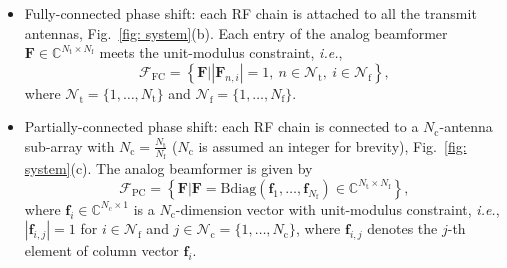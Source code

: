 \documentclass[10pt,journal,twocolumn]{IEEEtran}
\begin{document}
\begin{itemize}
\item Fully-connected phase shift: each RF chain is attached to all the transmit antennas,  Fig.~\ref{fig: system}(b). Each entry of the analog beamformer $\mathbf{F}\in\mathbb{C}^{N_{\text{t}}\times N_{\text{f}}}$ meets the unit-modulus constraint, \emph{i.e.}, 
\begin{equation}
\mathcal{F}_{\text{FC}}=\left\{\mathbf{F}\big|\left|\mathbf{F}_{n,i}\right|=1,~n\in\mathcal{N}_{\text{t}},~i\in\mathcal{N}_{\text{f}}\right\},
\end{equation}
where $\mathcal{N}_{\text{t}}=\{1,\dots,N_{\text{t}}\}$ and $\mathcal{N}_{\text{f}}=\{1,\dots,N_\text{f}\}$. 

\item Partially-connected phase shift: each RF chain is connected to a $N_{\text{c}}$-antenna sub-array with $N_{\text{c}}=\frac{N_{\text{t}}}{N_{\text{f}}}$ ($N_{\text{c}}$ is assumed an integer for brevity),  Fig.~\ref{fig: system}(c). The analog beamformer is given by
\begin{equation}
\mathcal{F}_{\text{PC}}=\left\{\mathbf{F}\big|\mathbf{F}=\text{Bdiag}\left(\mathbf{f}_1,\dots,\mathbf{f}_{N_{\text{f}}}\right)\in\mathbb{C}^{N_{\text{t}}\times N_{\text{f}}}\right\},
\end{equation}
where  $\mathbf{f}_{i}\in\mathbb{C}^{N_{\text{c}}\times 1}$ is a $N_{\text{c}}$-dimension vector with unit-modulus constraint, \emph{i.e.}, $\left|\mathbf{f}_{i,j}\right|=1$ for $i\in\mathcal{N}_{\text{f}}$ and $j\in\mathcal{N}_\text{c}=\{1,\dots,N_{\text{c}}\}$, where $\mathbf{f}_{i,j}$ denotes the $j$-th element of column vector $\mathbf{f}_i$.
\end{itemize}
\end{document}

